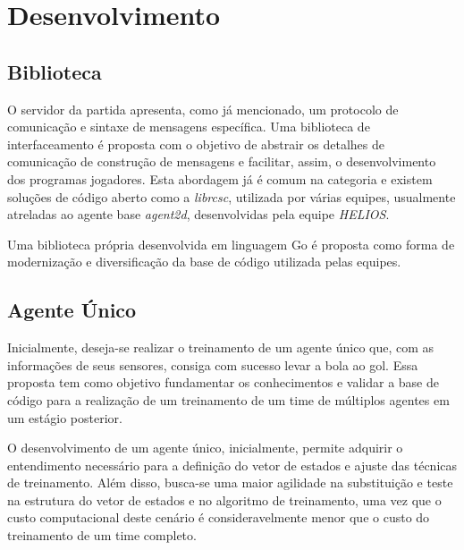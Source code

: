 \chapter{Desenvolvimento \label{chap:Desenvolvimento}}



\section{Biblioteca}
\par O servidor da partida apresenta, como já mencionado, um protocolo de comunicação e sintaxe de mensagens específica. Uma biblioteca de interfaceamento é proposta com o objetivo de abstrair os detalhes de comunicação de construção de mensagens e facilitar, assim, o desenvolvimento dos programas jogadores. Esta abordagem já é comum na categoria e existem soluções de código aberto como a \textit{librcsc}, utilizada por várias equipes, usualmente atreladas ao agente base \textit{agent2d}, desenvolvidas pela equipe \textit{HELIOS}.

\par Uma biblioteca própria desenvolvida em linguagem Go é proposta como forma de modernização e diversificação da base de código utilizada pelas equipes.

\section{Agente Único}
\par Inicialmente, deseja-se realizar o treinamento de um agente único que, com as informações de seus sensores, consiga com sucesso levar a bola ao gol. Essa proposta tem como objetivo fundamentar os conhecimentos e validar a base de código para a realização de um treinamento de um time de múltiplos agentes em um estágio posterior.
\par O desenvolvimento de um agente único, inicialmente, permite adquirir o entendimento necessário para a definição do vetor de estados e ajuste das técnicas de treinamento. Além disso, busca-se uma maior agilidade na substituição e teste na estrutura do vetor de estados e no algoritmo de treinamento, uma vez que o custo computacional deste cenário é consideravelmente menor que o custo do treinamento de um time completo.


